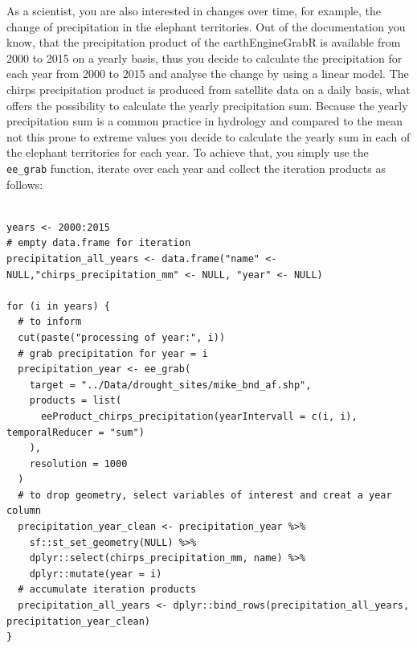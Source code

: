 \documentclass[11pt,twoside,a4paper,final]{report}
\begin{document}
As a scientist, you are also interested in changes over time, for example, the change of precipitation in the elephant territories. Out of the documentation you know, that the precipitation product of the earthEngineGrabR is available from 2000 to 2015 on a yearly basis, thus you decide to calculate the precipitation for each year from 2000 to 2015 and analyse the change by using a linear model. The chirps precipitation product is produced from satellite data on a daily basis, what offers the possibility to calculate the yearly precipitation sum. Because the yearly precipitation sum is a common practice in hydrology and compared to the mean not this prone to extreme values you decide to calculate the yearly sum in each of the elephant territories for each year. To achieve that, you simply use the \texttt{ee\_grab} function, iterate over each year and collect the iteration products as follows:

\begin{lstlisting}

years <- 2000:2015
# empty data.frame for iteration
precipitation_all_years <- data.frame("name" <- NULL,"chirps_precipitation_mm" <- NULL, "year" <- NULL)

for (i in years) {
  # to inform
  cut(paste("processing of year:", i))
  # grab precipitation for year = i
  precipitation_year <- ee_grab(
    target = "../Data/drought_sites/mike_bnd_af.shp",
    products = list(
      eeProduct_chirps_precipitation(yearIntervall = c(i, i), temporalReducer = "sum")
    ),
    resolution = 1000
  )
  # to drop geometry, select variables of interest and creat a year column
  precipitation_year_clean <- precipitation_year %>% 
    sf::st_set_geometry(NULL) %>% 
    dplyr::select(chirps_precipitation_mm, name) %>% 
    dplyr::mutate(year = i)
  # accumulate iteration products
  precipitation_all_years <- dplyr::bind_rows(precipitation_all_years, precipitation_year_clean)
}
\end{lstlisting}
\end{document}
